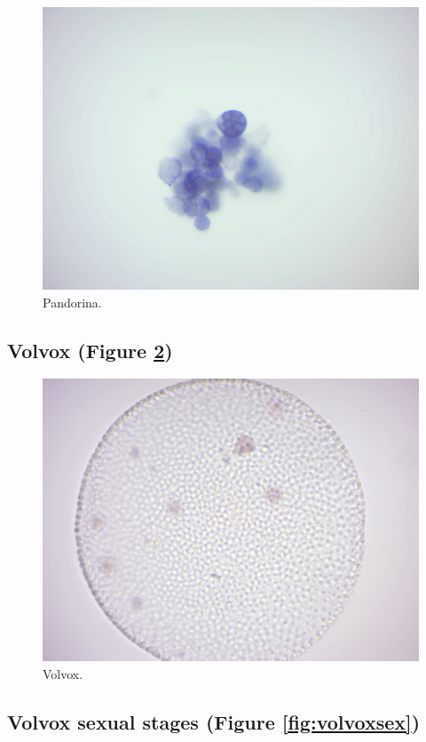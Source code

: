 \begin{figure}

{\centering \includegraphics[width=0.7\linewidth]{./figures/protists/pandorinadead} 

}

\caption{Pandorina.}\label{fig:pandorinadead}
\end{figure}

\subsection{Volvox (Figure
\ref{fig:volvoxdead})}\label{volvox-figure-reffigvolvoxdead}

\begin{figure}

{\centering \includegraphics[width=0.7\linewidth]{./figures/protists/volvox_dead} 

}

\caption{Volvox.}\label{fig:volvoxdead}
\end{figure}

\subsection{Volvox sexual stages (Figure
\ref{fig:volvoxsex})}\label{volvox-sexual-stages-figure-reffigvolvoxsex}

